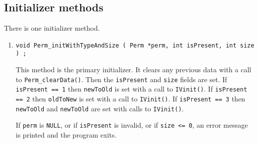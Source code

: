 \subsection{Initializer methods}
\label{subsection:Perm:proto:initializers}
\par
There is one initializer method.
\par
\begin{enumerate}
\item
\begin{verbatim}
void Perm_initWithTypeAndSize ( Perm *perm, int isPresent, int size ) ;
\end{verbatim}
This method is the primary initializer.
It clears any previous data with a call to 
{\tt Perm\_clearData()}.
Then the {\tt isPresent} and {\tt size} fields are set.
If {\tt isPresent == 1} then {\tt newToOld} is set with a call to
{\tt IVinit()}.
If {\tt isPresent == 2} then {\tt oldToNew} is set with a call to
{\tt IVinit()}.
If {\tt isPresent == 3} then {\tt newToOld} and {\tt newToOld} are set 
with calls to {\tt IVinit()}.
\par {}
If {\tt perm} is {\tt NULL}, 
or if {\tt isPresent} is invalid,
or if {\tt size <= 0},
an error message is printed and the program exits.
\end{enumerate}
\par
